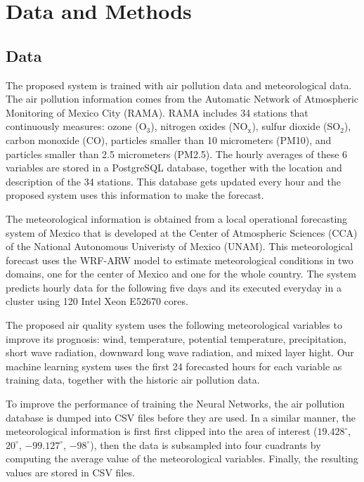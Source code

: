 \section{Data and Methods}


\subsection{Data}
The proposed system is trained with air pollution data and meteorological data. 
The air pollution information comes from  the Automatic Network of Atmospheric Monitoring of Mexico City (RAMA).
RAMA includes 34 stations that continuously measures: ozone (O$_3$), nitrogen oxides (NO$_\textrm{x}$), sulfur dioxide (SO$_2$), 
carbon monoxide (CO), particles smaller than 10 micrometers (PM10), and  particles smaller than 2.5 micrometers (PM2.5). 
The hourly averages of these 6 variables are stored in a PostgreSQL database, together with the location and description of the 34 stations. 
This database gets updated every hour and the proposed system uses this information to make the forecast. 

 The meteorological information is obtained from a local operational forecasting system of Mexico that
 is developed at the Center of Atmospheric Sciences (CCA) of the
 National Autonomous Univeristy of Mexico (UNAM). 
 This meteorological forecast uses the WRF-ARW model to estimate meteorological conditions
  in two domains, one for the center of Mexico and one for the whole country. The system 
 predicts hourly data for the following five days and its executed everyday 
 in a cluster using 120 Intel Xeon E52670 cores.

 The proposed air quality system uses the following meteorological variables to improve its prognosis:
 wind, temperature, potential temperature, precipitation, short wave radiation, 
 downward long wave radiation, and mixed layer hight. Our machine learning 
 system uses the first 24 forecasted hours for each variable as training data, together
 with the historic air pollution data. 

To improve the performance of training the Neural Networks, the air pollution database is 
dumped into CSV files before they are used. In a similar manner, the meteorological information is first 
first clipped into the area of interest ($19.428^\circ$, $20^\circ$, $-99.127^\circ$, $-98^\circ$), 
then the data is subsampled into four cuadrants by computing the average value of the meteorological
variables. Finally, the resulting values are stored in CSV files. 


